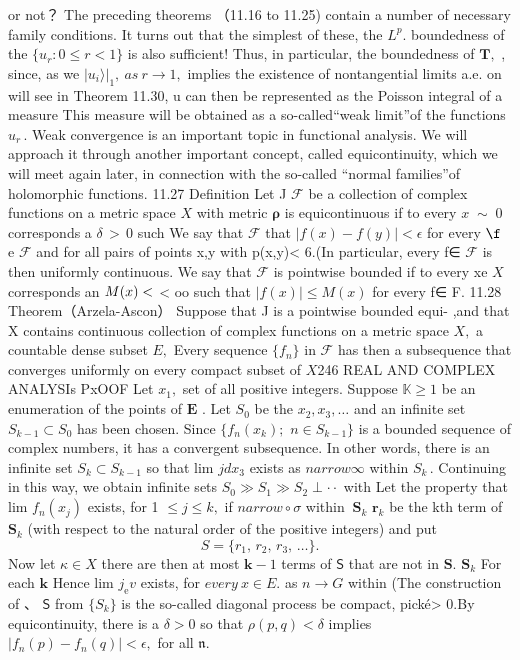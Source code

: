 or not？ The preceding theorems （11.16 to 11.25) contain a number of necessary family conditions. It turns out that the simplest of these, the $L^{p}.$ boundedness of the $\{u_{r}\colon0\leq r<1\}$ is also sufficient! Thus, in particular, the boundedness of ${\boldsymbol{T}},$ , since, as we $|u_{i}\rangle|_{1},\ a s\ r\to1,$ implies the existence of nontangential limits a.e. on will see in Theorem 11.30, u can then be represented as the Poisson integral of a measure This measure will be obtained as a so-called“weak limit”of the functions $u_{r}\,.$ Weak convergence is an important topic in functional analysis. We will approach it through another important concept, called equicontinuity, which we will meet again later, in connection with the so-called “normal families”of holomorphic functions. 11.27 Definition Let J $\textstyle{\mathcal{F}}$ be a collection of complex functions on a metric space $X$ with metric $\boldsymbol{\rho}$ is equicontinuous if to every $\scriptstyle x\;{\sim}\;0$ corresponds a $\scriptstyle{\delta\,>\,0}$ such We say that $\mathcal{F}$ that $|f(x)-f(y)|<\epsilon$ for every $\boldsymbol{\f}$ e $\textstyle{\mathcal{F}}$ and for all pairs of points x,y with p(x,y)< 6.(In particular, every f∈ ${\mathcal{F}}$ is then uniformly continuous. We say that $\textstyle{\mathcal{F}}$ is pointwise bounded if to every xe $\textstyle X{\ ~}$ corresponds an $M(x)<\protect$ < oo such that $|f(x)|\leq M(x)$ for every f∈ F. 11.28 Theorem（Arzela-Ascon） Suppose that J is a pointwise bounded equi- ,and that X contains continuous collection of complex functions on a metric space $X,$ a countable dense subset $\textstyle E,$ Every sequence $\{f_{n}\}$ in ${\mathcal{F}}$ has then a subsequence that converges uniformly on every compact subset of $X$246 REAL AND COMPLEX ANALYSIs PxOOF Let $x_{1},$ set of all positive integers. Suppose $\mathbb{K}\geq1$ be an enumeration of the points of $\boldsymbol{E}$ . Let $S_{0}$ be the $x_{2},x_{3},\dotsc$ and an infinite set $S_{k-1}\subset S_{0}$ has been chosen. Since $\{f_{n}(x_{k});$ $n\in S_{k-1}\}$ is a bounded sequence of complex numbers, it has a convergent subsequence. In other words, there is an infinite set $S_{k}\subset S_{k-1}$ so that lim $\scriptstyle j d x_{3}$ exists as $n{ arrow}\infty$ within ${\mathbf{}}S_{k}\,.$ Continuing in this way, we obtain infinite sets $S_{0}\gg S_{1}\gg S_{2}\perp\cdot\cdot$ with Let the property that lim $f_{n}(x_{j})$ exists, for 1 $\leq j\leq k,$ if $n{ arrow}\circ\sigma$ within $\ {\boldsymbol{S}}_{k}$ ${\boldsymbol{r}}_{k}$ be the kth term of ${\boldsymbol{S}}_{k}$ (with respect to the natural order of the positive integers) and put $$ S=\{r_{1},\,r_{2},\,r_{3},\,\ldots\}. $$ Now let $\kappa\in X$ there are then at most ${\boldsymbol{k}}-1$ terms of $\boldsymbol{\mathsf{S}}$ that are not in ${\boldsymbol{S}}.$ ${\boldsymbol{S}}_{k}$ For each $\boldsymbol{k}$ Hence lim $\scriptstyle{j_{\mathrm{e}}v}$ exists, for $e v e r y\ x\in E.$ as $\textstyle n\!\to\!G$ within (The construction of 、 $\boldsymbol{\mathsf{S}}$ from $\{S_{k}\}$ is the so-called diagonal process be compact, pické> 0.By equicontinuity, there is a $\scriptstyle\delta>0$ so that $\rho(p,q)<\delta$ implies $|f_{n}(p)-f_{n}(q)|<\epsilon,$ for all ${\mathfrak{n}}.$ 